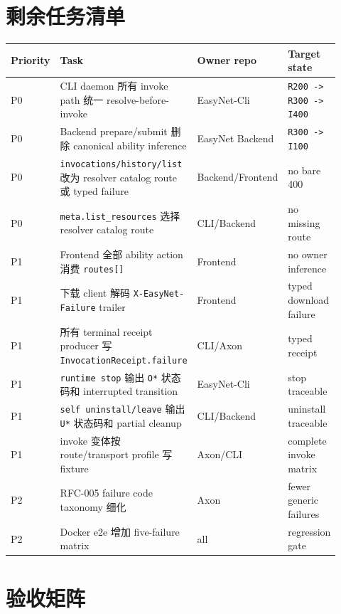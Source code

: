 \documentclass[11pt]{article}
\newcommand{\code}[1]{\texttt{#1}}
\begin{document}
\section{剩余任务清单}

\begin{longtable}{L{0.10\linewidth} L{0.46\linewidth} L{0.22\linewidth} L{0.14\linewidth}}
\toprule
Priority & Task & Owner repo & Target state \\
\midrule
P0 & CLI daemon 所有 invoke path 统一 resolve-before-invoke & EasyNet-Cli & \code{R200 -> R300 -> I400} \\
P0 & Backend prepare/submit 删除 canonical ability inference & EasyNet Backend & \code{R300 -> I100} \\
P0 & \code{invocations/history/list} 改为 resolver catalog route 或 typed failure & Backend/Frontend & no bare 400 \\
P0 & \code{meta.list\_resources} 选择 resolver catalog route & CLI/Backend & no missing route \\
P1 & Frontend 全部 ability action 消费 \code{routes[]} & Frontend & no owner inference \\
P1 & 下载 client 解码 \code{X-EasyNet-Failure} trailer & Frontend & typed download failure \\
P1 & 所有 terminal receipt producer 写 \code{InvocationReceipt.failure} & CLI/Axon & typed receipt \\
P1 & \code{runtime stop} 输出 \code{O*} 状态码和 interrupted transition & EasyNet-Cli & stop traceable \\
P1 & \code{self uninstall/leave} 输出 \code{U*} 状态码和 partial cleanup & CLI/Backend & uninstall traceable \\
P1 & invoke 变体按 route/transport profile 写 fixture & Axon/CLI & complete invoke matrix \\
P2 & RFC-005 failure code taxonomy 细化 & Axon & fewer generic failures \\
P2 & Docker e2e 增加 five-failure matrix & all & regression gate \\
\bottomrule
\end{longtable}

\section{验收矩阵}
\end{document}
